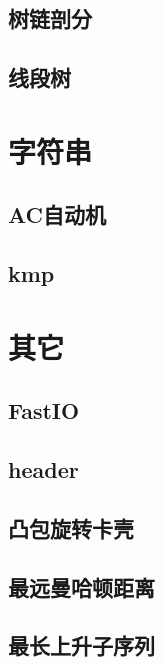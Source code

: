 \documentclass[twocolumn,a4,twoside]{book}
\begin{document}
		\section{树链剖分}
		
		\section{线段树}
		
	
	
	\chapter{字符串}
		\section{AC自动机}
		
		\section{kmp}
		
		
	\chapter{其它}
		\section{FastIO}
		
		\section{header}
		
		\section{凸包旋转卡壳}
		
		\section{最远曼哈顿距离}
		
		\section{最长上升子序列}
		
\end{document}
